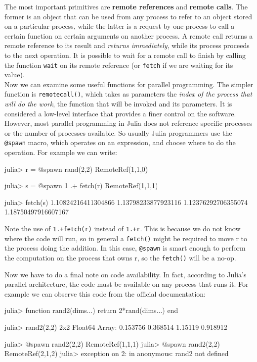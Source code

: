 The most important primitives are \textbf{remote references} and \textbf{remote calls}. The former is an object that can be used from any process to refer to an object stored on a particular process, while the latter is a request by one process to call a certain function on certain arguments on another process. A remote call returns a remote reference to its result and \textit{returns immediately}, while its process proceeds to the next operation. It is possible to wait for a remote call to finish by calling the function \texttt{wait} on its remote reference (or \texttt{fetch} if we are waiting for its value).\\

Now we can examine some useful functions for parallel programming. The simpler function is \texttt{remotecall()}, which takes as parameters the \textit{index of the process that will do the work}, the function that will be invoked and its parameters. It is considered a low-level interface that provides a finer control on the software. However, most parallel programming in Julia does not reference specific processes or the number of processes available. So usually Julia programmers use the \texttt{@spawn} macro, which operates on an expression, and choose where to do the operation. For example we can write:
\begin{julia}
 julia> r = @spawn rand(2,2)
 RemoteRef(1,1,0)

 julia> s = @spawn 1 .+ fetch(r)
 RemoteRef(1,1,1)

 julia> fetch(s)
 1.10824216411304866 1.13798233877923116
 1.12376292706355074 1.18750497916607167
\end{julia}
Note the use of \texttt{1.+fetch(r)} instead of \texttt{1.+r}. This is because we do not know where the code will run, so in general a \texttt{fetch()} might be required to move r to the process doing the addition. In this case, \texttt{@spawn} is smart enough to perform the computation on the process that owns r, so the \texttt{fetch()} will be a no-op.

Now we have to do a final note on code availability. In fact, according to Julia's parallel architecture, the code must be available on any process that runs it. For example we can observe this code from the official documentation:
\begin{julia}
 julia> function rand2(dims...)
          return 2*rand(dims...)
        end

 julia> rand2(2,2)
 2x2 Float64 Array:
  0.153756  0.368514
  1.15119   0.918912

 julia> @spawn rand2(2,2)
 RemoteRef(1,1,1)
 julia> @spawn rand2(2,2)
 RemoteRef(2,1,2)
 julia> exception on 2: in anonymous: rand2 not defined
\end{julia}

